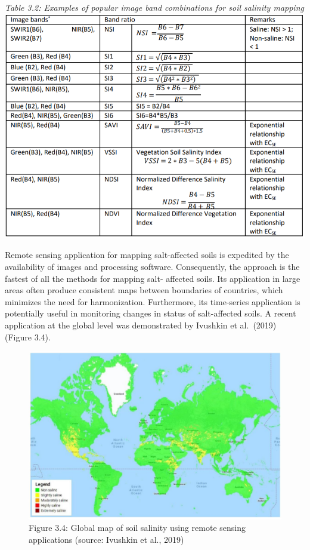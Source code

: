 \documentclass[
  10pt,
  b5paper,
]{book}
\begin{document}
\emph{Table 3.2: Examples of popular image band combinations for soil salinity mapping}
\includegraphics{figures/tables/Table_3.2.png}

Remote sensing application for mapping salt-affected soils is expedited by the availability of images and processing software. Consequently, the approach is the fastest of all the methods for mapping salt- affected soils. Its application in large areas often produce consistent maps between boundaries of countries, which minimizes the need for harmonization. Furthermore, its time-series application is potentially useful in monitoring changes in status of salt-affected soils. A recent application at the global level was demonstrated by Ivushkin et al.~(2019) (Figure 3.4).

\begin{figure}
\centering
\includegraphics{figures/images/Figure3.f.jpg}
\caption{Figure 3.4: Global map of soil salinity using remote sensing applications (source: Ivushkin et al., 2019)}
\end{figure}
\end{document}
